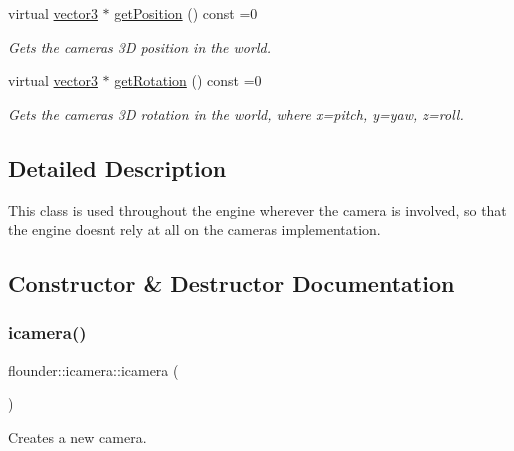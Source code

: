 \begin{DoxyCompactItemize}
virtual \hyperlink{classflounder_1_1vector3}{vector3} $\ast$ \hyperlink{classflounder_1_1icamera_aa6639f6919b4bc30b05fc8d73bf57ab2}{get\+Position} () const =0
\begin{DoxyCompactList}\small\item\em Gets the cameras 3D position in the world. \end{DoxyCompactList}\item 
virtual \hyperlink{classflounder_1_1vector3}{vector3} $\ast$ \hyperlink{classflounder_1_1icamera_a708d9b2cab040a78e522dc8a9864d959}{get\+Rotation} () const =0
\begin{DoxyCompactList}\small\item\em Gets the cameras 3D rotation in the world, where x=pitch, y=yaw, z=roll. \end{DoxyCompactList}\end{DoxyCompactItemize}


\subsection{Detailed Description}
This class is used throughout the engine wherever the camera is involved, so that the engine doesn\textquotesingle{}t rely at all on the camera\textquotesingle{}s implementation. 



\subsection{Constructor \& Destructor Documentation}
\mbox{\label{classflounder_1_1icamera_aec1dc813f1b6a4b4ea2c56d61fa28525}} 
\subsubsection{\texorpdfstring{icamera()}{icamera()}}
{\footnotesize\ttfamily flounder\+::icamera\+::icamera (\begin{DoxyParamCaption}{ }\end{DoxyParamCaption})\hspace{0.3cm}{\ttfamily [inline]}}



Creates a new camera. 

\mbox{\label{classflounder_1_1icamera_a5aa4bb60028823af733a8de1532b7f6f}} 
